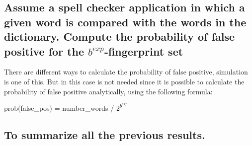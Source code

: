 \documentclass{report}
\begin{document}
{			\subsection{Assume a spell checker application in which a given word is compared with the words in the dictionary. Compute the probability of false positive for the $b^{exp}$-fingerprint set}
			There are different ways to calculate the probability of false positive, simulation is one of this. But in this case is not needed since it is possible to calculate the probability of false positive analytically, using the following formula:
			\begin{center}
					prob(false\_pos) = number\_words / $2^{b^{exp}}$
			\end{center}
			
			\subsection{To summarize all the previous results.}

}
\end{document}
